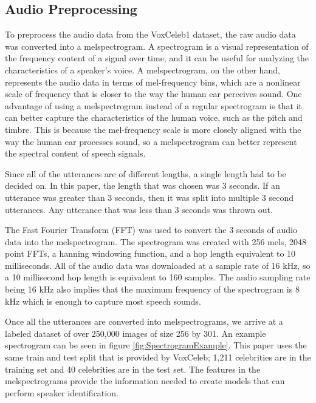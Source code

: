 \documentclass{article}
\begin{document}
\subsection{Audio Preprocessing}
To preprocess the audio data from the VoxCeleb1 dataset, the raw audio data was converted into a melspectrogram. A 
spectrogram is a visual representation of the frequency content of a signal over time, and it can be useful for 
analyzing the characteristics of a speaker's voice. A melspectrogram, on the other hand, represents the audio data in 
terms of mel-frequency bins, which are a nonlinear scale of frequency that is closer to the way the human ear perceives 
sound. One advantage of using a melspectrogram instead of a regular spectrogram is that it can better capture the 
characteristics of the human voice, such as the pitch and timbre. This is because the mel-frequency scale is more closely 
aligned with the way the human ear processes sound, so a melspectrogram can better represent the spectral content of speech signals.

Since all of the utterances are of different lengths, a single length had to be decided on. In this paper, the 
length that was chosen was 3 seconds. If an utterance was greater than 3 seconds, then it was split into multiple 3 
second utterances. Any utterance that was less than 3 seconds was thrown out.

The Fast Fourier Transform (FFT) was used to convert the 3 seconds of audio data into the melspectrogram. The spectrogram
was created with 256 mels, 2048 point FFTs, a hanning windowing function, and a hop length equivalent to 10 milliseconds. 
All of the audio data was downloaded at a sample rate of 16 kHz, so a 10 millisecond hop length is equivalent to 160 
samples. The audio sampling rate being 16 kHz also implies that the maximum frequency of the spectrogram is 8 kHz which 
is enough to capture most speech sounds.

Once all the utterances are converted into melspectrograms, we arrive at a labeled dataset of over 250,000 images of 
size 256 by 301. An example spectrogram can be seen in figure \ref{fig:SpectrogramExample}. This paper uses the same 
train and test split that is provided by VoxCeleb; 1,211 celebrities are in the training set and 40 celebrities are in 
the test set. The features in the melspectrograms provide the information needed to create models that can perform 
speaker identification.
\end{document}
